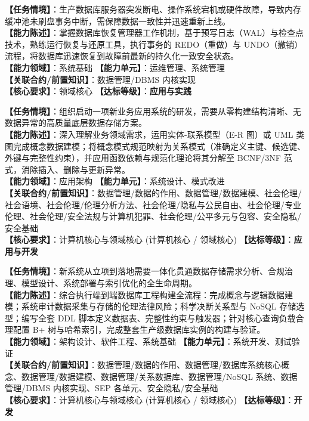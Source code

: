 \begin{taskbox}
\textbf{【任务情境】}：生产数据库服务器突发断电、操作系统宕机或硬件故障，导致内存缓冲池未刷盘事务中断，需保障数据一致性并迅速重新上线。\\
\textbf{【能力陈述】}：掌握数据库恢复管理器工作机制，基于预写日志（WAL）与检查点技术，熟练运行恢复与还原工具，执行事务的 REDO（重做）与 UNDO（撤销）流程，将数据库迅速恢复到故障前最新的持久化一致安全状态。\\
\textbf{【能力领域】}：系统基础 \quad \textbf{【能力单元】}：运维管理、系统管理\\
\textbf{【关联合约/前置知识】}：数据管理/DBMS 内核实现\\
\textbf{【核心要求】}：领域核心 \quad \textbf{【达标等级】}：\textbf{应用与实践}
\end{taskbox}

\begin{taskbox}[任务 7：面向新业务应用完成从概念建模到关系规范化存储设计]
\textbf{【任务情境】}：组织启动一项新业务应用系统的研发，需要从零构建结构清晰、无数据异常的高质量底层数据存储方案。\\
\textbf{【能力陈述】}：深入理解业务领域需求，运用实体-联系模型（E-R 图）或 UML 类图完成概念数据建模；将概念模式规范映射为关系模式（准确定义主键、候选键、外键与完整性约束），并应用函数依赖与规范化理论将其分解至 BCNF/3NF 范式，消除插入、删除与更新异常。\\
\textbf{【能力领域】}：应用架构 \quad \textbf{【能力单元】}：系统设计、模式改进\\
\textbf{【关联合约/前置知识】}：数据管理/数据的作用、数据管理/数据建模、社会伦理/社会语境、社会伦理/伦理分析方法、社会伦理/隐私与公民自由、社会伦理/专业伦理、社会伦理/安全法规与计算机犯罪、社会伦理/公平多元与包容、安全隐私/安全基础\\
\textbf{【核心要求】}：计算机核心与领域核心 (计算机核心 / 领域核心) \quad \textbf{【达标等级】}：\textbf{应用与开发}
\end{taskbox}

\begin{taskbox}[任务 8：端到端完整实现新应用数据库系统的工程构建与部署落地]
\textbf{【任务情境】}：新系统从立项到落地需要一体化贯通数据存储需求分析、合规治理、模型设计、系统部署与索引优化的全生命周期。\\
\textbf{【能力陈述】}：综合执行端到端数据库工程构建全流程：完成概念与逻辑数据建模；系统审计数据采集与存储的伦理法律风险；科学决断关系型与 NoSQL 存储选型；编写全套 DDL 脚本定义数据表、完整性约束与触发器；针对核心查询负载合理配置 B+ 树与哈希索引，完成整套生产级数据库实例的构建与验证。\\
\textbf{【能力领域】}：架构设计、软件工程、系统基础 \quad \textbf{【能力单元】}：系统开发、测试验证\\
\textbf{【关联合约/前置知识】}：数据管理/数据的作用、数据管理/数据库系统核心概念、数据管理/数据建模、数据管理/关系数据库、数据管理/NoSQL 系统、数据管理/DBMS 内核实现、SEP 各单元、安全隐私/安全基础\\
\textbf{【核心要求】}：计算机核心与领域核心 (计算机核心 / 领域核心) \quad \textbf{【达标等级】}：\textbf{开发}
\end{taskbox}

